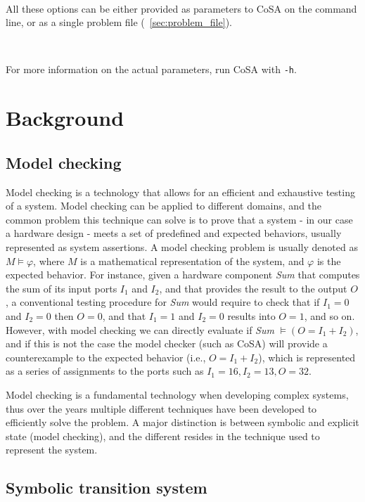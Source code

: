 \documentclass{article}
\theoremstyle{definition}
\begin{document}
\

\noindent
All these options can be either provided as parameters to CoSA on the
command line, or as a single problem file
(\textsection~\ref{sec:problem_file}).

\

\noindent
For more information on the actual parameters, run CoSA with
\texttt{-h}.


\section{Background}

\subsection{Model checking}
\label{sec:model_checking}
Model checking is a technology that allows for an efficient and
exhaustive testing of a system. Model checking can be applied to
different domains, and the common problem this technique can solve is
to prove that a system - in our case a hardware design - meets a set
of predefined and expected behaviors, usually represented as system
assertions. A model checking problem is usually denoted as $M \models
\varphi$, where $M$ is a mathematical representation of the system,
and $\varphi$ is the expected behavior. For instance, given a hardware
component \emph{Sum} that computes the sum of its input ports $I_1$
and $I_2$, and that provides the result to the output $O$, a
conventional testing procedure for \emph{Sum} would require to check
that if $I_1=0$ and $I_2=0$ then $O=0$, and that $I_1=1$ and $I_2=0$
results into $O=1$, and so on. However, with model checking we can
directly evaluate if \emph{Sum} $ \models (O=I_1+I_2)$, and if this is
not the case the model checker (such as CoSA) will provide a
counterexample to the expected behavior (i.e., $O=I_1+I_2$), which is
represented as a series of assignments to the ports such as $I_1=16,
I_2=13, O=32$.

Model checking is a fundamental technology when developing complex
systems, thus over the years multiple different techniques have been
developed to efficiently solve the problem. A major distinction is
between symbolic and explicit state (model checking), and the
different resides in the technique used to represent the system. 

\subsection{Symbolic transition system}
\label{sec:sts}
\end{document}
